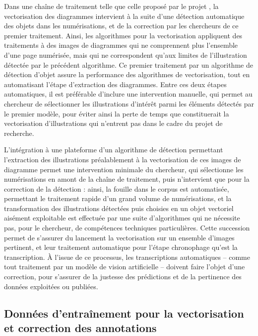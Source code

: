 	Dans une chaîne de traitement telle que celle proposé par le projet \eida, la vectorisation des diagrammes intervient à la suite d'une détection automatique des objets dans les numérisations, et de la correction par les chercheurs de ce premier traitement. Ainsi, les algorithmes pour la vectorisation appliquent des traitements à des images de diagrammes qui ne comprennent plus l'ensemble d'une page numérisée, mais qui ne correspondent qu'aux limites de l'illustration détectée par le précédent algorithme. Ce premier traitement par un algorithme de détection d'objet assure la performance des algorithmes de vectorisation, tout en automatisant l'étape d'extraction des diagrammes. Entre ces deux étapes automatiques, il est préférable d'inclure une intervention manuelle, qui permet au chercheur de sélectionner les illustrations d'intérêt parmi les éléments détectés par le premier modèle, pour éviter ainsi la perte de temps que constituerait la vectorisation d'illustrations qui n'entrent pas dans le cadre du projet de recherche. 
	
	L'intégration à une plateforme d'un algorithme de détection permettant l'extraction des illustrations préalablement à la vectorisation de ces images de diagramme permet une intervention minimale du chercheur, qui sélectionne les numérisations en amont de la chaîne de traitement, puis n'intervient que pour la correction de la détection : ainsi, la fouille dans le corpus est automatisée, permettant le traitement rapide d'un grand volume de numérisations, et la transformation des illustrations détectées puis choisies en un objet vectoriel aisément exploitable est effectuée par une suite d'algorithmes qui ne nécessite pas, pour le chercheur, de compétences techniques particulières. Cette succession permet de s'assurer du lancement la vectorisation sur un ensemble d'images pertinent, et leur traitement automatique pour l'étape chronophage qu'est la transcription. À l'issue de ce processus, les transcriptions automatiques -- comme tout traitement par un modèle de vision artificielle -- doivent faire l'objet d'une correction, pour s'assurer de la justesse des prédictions et de la pertinence des données exploitées ou publiées.

\subsection{Données d’entraînement pour la vectorisation et correction des annotations}
